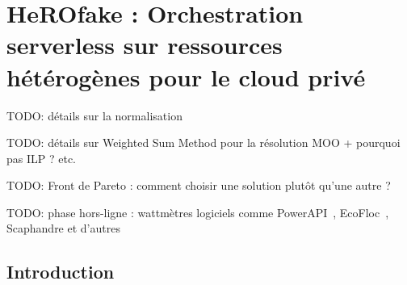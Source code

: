 \chapter{HeROfake : Orchestration serverless sur ressources hétérogènes pour le cloud privé}

TODO: détails sur la normalisation

TODO: détails sur Weighted Sum Method pour la résolution MOO + pourquoi pas ILP ? etc.

TODO: Front de Pareto : comment choisir une solution plutôt qu'une autre ?

TODO: phase hors-ligne : wattmètres logiciels comme PowerAPI~\cite{fieniPowerAPIPythonFramework2024}, EcoFloc~\cite{valeraEnergySavingPerspective}, Scaphandre et d'autres~\cite{jayExperimentalComparisonSoftwarebased2023}

\section{Introduction}
\label{section:herofake-introduction}

